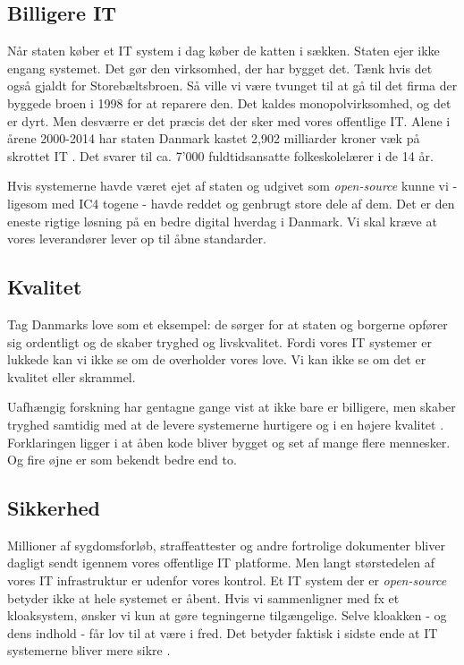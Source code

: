 \documentclass[fleqn]{article}
\begin{document}
\subsection{Billigere IT}
Når staten køber et IT system i dag køber de katten i sækken. Staten ejer ikke engang
systemet. Det gør den virksomhed, der har bygget det. Tænk hvis det også gjaldt for
Storebæltsbroen. Så ville vi være tvunget til at gå til det firma der byggede
broen i 1998 for at reparere den. Det kaldes monopolvirksomhed, og det er dyrt.
Men desværre er det præcis det der sker med vores offentlige IT. Alene i årene 
2000-2014 har staten Danmark kastet 2,902 milliarder kroner væk på skrottet IT
\cite{dr8}. Det svarer til ca. 7'000 fuldtidsansatte folkeskolelærer i de 14 år.

Hvis systemerne havde været ejet af staten og udgivet som \textit{open-source} kunne vi
- ligesom med IC4 togene - havde reddet og genbrugt store dele af dem. 
Det er den eneste rigtige løsning på en bedre digital hverdag i Danmark. Vi skal kræve
at vores leverandører lever op til åbne standarder. 

\subsection{Kvalitet}
Tag Danmarks love som et eksempel: de sørger for at staten og borgerne opfører sig 
ordentligt og de skaber tryghed og livskvalitet. Fordi vores IT systemer er lukkede
kan vi ikke se om de overholder vores love. Vi kan ikke se om det er kvalitet eller skrammel.

Uafhængig forskning har gentagne gange vist at  ikke bare er billigere,
men skaber tryghed samtidig med at de levere systemerne hurtigere og i en højere kvalitet \cite{Samoladas, Reynolds}.
Forklaringen ligger i at åben kode bliver bygget og set af mange flere mennesker. Og fire
øjne er som bekendt bedre end to.

\subsection{Sikkerhed}
Millioner af sygdomsforløb, straffeattester og andre fortrolige
dokumenter bliver dagligt sendt igennem vores offentlige IT platforme. Men langt størstedelen
af vores IT infrastruktur er udenfor vores kontrol.
Et IT system der er \textit{open-source} betyder ikke at hele systemet er åbent. 
Hvis vi sammenligner med fx et kloaksystem, ønsker vi kun at gøre tegningerne
tilgængelige. Selve kloakken - og dens indhold - får lov til at være i fred.
Det betyder faktisk i sidste ende at IT systemerne bliver mere sikre \cite{Samoladas, Reynolds}.
\end{document}
